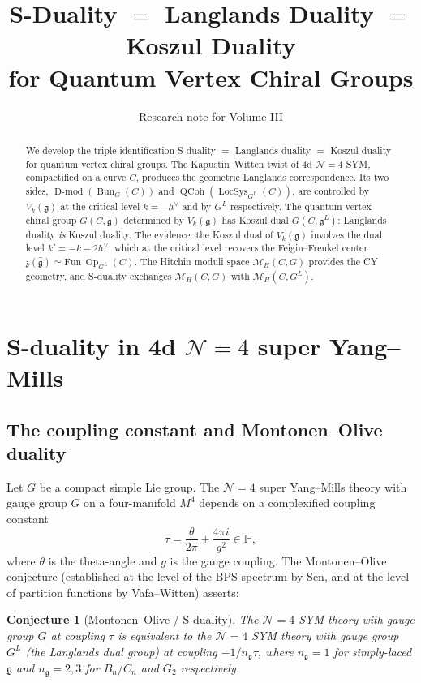 \documentclass[11pt]{article}
\title{S-Duality $=$ Langlands Duality $=$ Koszul Duality \\[4pt]
\large for Quantum Vertex Chiral Groups}
\author{Research note for Volume III}
\date{}
\newtheorem{conjecture}[theorem]{Conjecture}
\theoremstyle{definition}
\theoremstyle{remark}
\DeclareMathOperator{\Bun}{Bun}
\DeclareMathOperator{\LocSys}{LocSys}
\DeclareMathOperator{\QCoh}{QCoh}
\DeclareMathOperator{\Dmod}{D\text{-}mod}
\DeclareMathOperator{\Op}{Op}
\newcommand{\g}{\mathfrak{g}}
\newcommand{\gL}{\mathfrak{g}^L}
\newcommand{\hv}{h^\vee}
\begin{document}
\maketitle

\begin{abstract}
We develop the triple identification S-duality $=$ Langlands duality $=$ Koszul duality for quantum vertex chiral groups. The Kapustin--Witten twist of 4d $\mathcal{N}=4$ SYM, compactified on a curve $C$, produces the geometric Langlands correspondence. Its two sides, $\Dmod(\Bun_G(C))$ and $\QCoh(\LocSys_{G^L}(C))$, are controlled by $V_k(\g)$ at the critical level $k = -\hv$ and by $G^L$ respectively. The quantum vertex chiral group $G(C,\g)$ determined by $V_k(\g)$ has Koszul dual $G(C,\gL)$: Langlands duality \emph{is} Koszul duality. The evidence: the Koszul dual of $V_k(\g)$ involves the dual level $k' = -k - 2\hv$, which at the critical level recovers the Feigin--Frenkel center $\mathfrak{z}(\hat{\g}) \simeq \mathrm{Fun}\,\Op_{G^L}(C)$. The Hitchin moduli space $\mathcal{M}_H(C,G)$ provides the CY geometry, and S-duality exchanges $\mathcal{M}_H(C,G)$ with $\mathcal{M}_H(C,G^L)$.
\end{abstract}

\tableofcontents

\section{S-duality in 4d $\mathcal{N}=4$ super Yang--Mills}
\label{sec:s-duality}

\subsection{The coupling constant and Montonen--Olive duality}

Let $G$ be a compact simple Lie group. The $\mathcal{N}=4$ super Yang--Mills
theory with gauge group $G$ on a four-manifold $M^4$ depends on a complexified
coupling constant
\[
 \tau = \frac{\theta}{2\pi} + \frac{4\pi i}{g^2} \in \mathbb{H},
\]
where $\theta$ is the theta-angle and $g$ is the gauge coupling.
The Montonen--Olive conjecture (established at the level of the BPS spectrum
by Sen, and at the level of partition functions by Vafa--Witten) asserts:

\begin{conjecture}[Montonen--Olive / S-duality]
\label{conj:montonen-olive}
The $\mathcal{N}=4$ SYM theory with gauge group $G$ at coupling $\tau$ is
equivalent to the $\mathcal{N}=4$ SYM theory with gauge group $G^L$
(the Langlands dual group) at coupling $-1/n_\g\tau$, where $n_\g = 1$ for
simply-laced $\g$ and $n_\g = 2,3$ for $B_n/C_n$ and $G_2$ respectively.
\end{conjecture}
\end{document}
